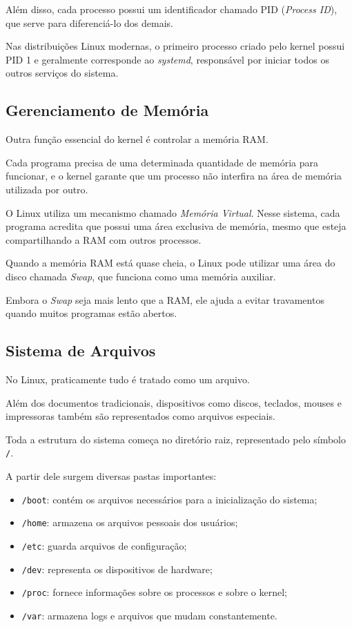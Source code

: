 \documentclass{article}
\begin{document}
Além disso, cada processo possui um identificador chamado PID (\textit{Process ID}), que serve para diferenciá-lo dos demais.

Nas distribuições Linux modernas, o primeiro processo criado pelo kernel possui PID 1 e geralmente corresponde ao \textit{systemd}, responsável por iniciar todos os outros serviços do sistema.

\subsection{Gerenciamento de Memória}

Outra função essencial do kernel é controlar a memória RAM.

Cada programa precisa de uma determinada quantidade de memória para funcionar, e o kernel garante que um processo não interfira na área de memória utilizada por outro.

O Linux utiliza um mecanismo chamado \textit{Memória Virtual}. Nesse sistema, cada programa acredita que possui uma área exclusiva de memória, mesmo que esteja compartilhando a RAM com outros processos.

Quando a memória RAM está quase cheia, o Linux pode utilizar uma área do disco chamada \textit{Swap}, que funciona como uma memória auxiliar.

Embora o \textit{Swap} seja mais lento que a RAM, ele ajuda a evitar travamentos quando muitos programas estão abertos.

\subsection{Sistema de Arquivos}

No Linux, praticamente tudo é tratado como um arquivo.

Além dos documentos tradicionais, dispositivos como discos, teclados, mouses e impressoras também são representados como arquivos especiais.

Toda a estrutura do sistema começa no diretório raiz, representado pelo símbolo \texttt{/}.

A partir dele surgem diversas pastas importantes:

\begin{itemize}
\item \texttt{/boot}: contém os arquivos necessários para a inicialização do sistema;
\item \texttt{/home}: armazena os arquivos pessoais dos usuários;
\item \texttt{/etc}: guarda arquivos de configuração;
\item \texttt{/dev}: representa os dispositivos de hardware;
\item \texttt{/proc}: fornece informações sobre os processos e sobre o kernel;
\item \texttt{/var}: armazena logs e arquivos que mudam constantemente.
\end{itemize}
\end{document}
